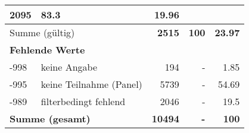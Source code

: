 \begin{longtable}{lXrrr}
       \num{2095} &
       \num[round-mode=places,round-precision=2]{83,3} &
         \num[round-mode=places,round-precision=2]{19,96} \\
     \midrule
     \multicolumn{2}{l}{Summe (gültig)} &
       \textbf{\num{2515}} &
     \textbf{100} &
       \textbf{\num[round-mode=places,round-precision=2]{23,97}} \\
     \multicolumn{5}{l}{\textbf{Fehlende Werte}}\\
       -998 &
       keine Angabe &
         \num{194} &
        - &
         \num[round-mode=places,round-precision=2]{1,85} \\
       -995 &
       keine Teilnahme (Panel) &
         \num{5739} &
        - &
         \num[round-mode=places,round-precision=2]{54,69} \\
       -989 &
       filterbedingt fehlend &
         \num{2046} &
        - &
         \num[round-mode=places,round-precision=2]{19,5} \\
     \midrule
     \multicolumn{2}{l}{\textbf{Summe (gesamt)}} &
          \textbf{\num{10494}} &
        \textbf{-} &
        \textbf{100} \\
     \bottomrule
     \end{longtable}
     
